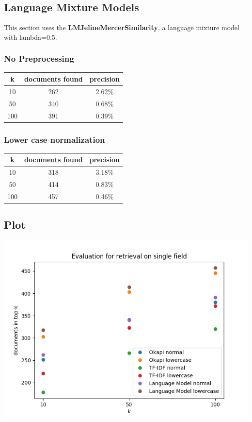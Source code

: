 \documentclass{article}
\begin{document}
\subsection{Language Mixture Models}
This section uses the \textbf{LMJelineMercerSimilarity}, a language mixture model with lambda=0.5.
\subsubsection{No Preprocessing}
\begin{center}
\begin{tabular}{|c|c|c|} \hline
\textbf{k} & \textbf{documents found} & \textbf{precision} \\ \hline
10 & 262 & 2.62\%\\
50 & 340 & 0.68\%\\
100 & 391 & 0.39\%\\ \hline

\end{tabular}
\end{center}

\subsubsection{Lower case normalization}
\begin{center}
\begin{tabular}{|c|c|c|} \hline
\textbf{k} & \textbf{documents found} & \textbf{precision}\\ \hline
10 & 318 & 3.18\%\\
50 & 414 & 0.83\%\\
100 & 457 & 0.46\%\\ \hline

\end{tabular}
\end{center}

\subsection{Plot}
\includegraphics[width=\textwidth]{one_field}
\end{document}

